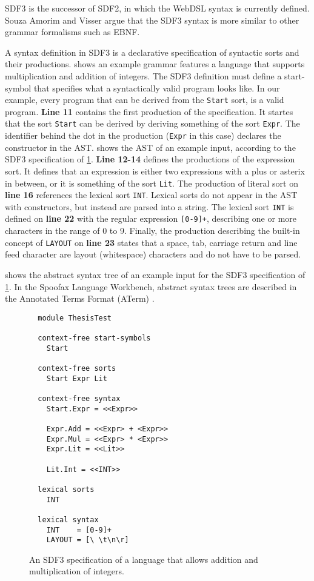       SDF3 is the successor of SDF2, in which the WebDSL syntax is currently defined. Souza Amorim and Visser \citeyear{AmorimV20} argue that the SDF3 syntax is more similar to other grammar formalisms such as EBNF.

      A syntax definition in SDF3 is a declarative specification of syntactic sorts and their productions.  shows an example grammar features a language that supports multiplication and addition of integers. The SDF3 definition must define a start-symbol that specifies what a syntactically valid program looks like. In our example, every program that can be derived from the \texttt{Start} sort, is a valid program. \textbf{Line 11} contains the first production of the specification. It startes that the sort \texttt{Start} can be derived by deriving something of the sort \texttt{Expr}. The identifier behind the dot in the production (\texttt{Expr} in this case) declares the constructor in the AST.  shows the AST of an example input, according to the SDF3 specification of \cref{fig:sdf3-sorts-and-productions-syntax}. \textbf{Line 12-14} defines the productions of the expression sort. It defines that an expression is either two expressions with a plus or asterix in between, or it is something of the sort \texttt{Lit}. The production of literal sort on \textbf{line 16} references the lexical sort \texttt{INT}. Lexical sorts do not appear in the AST with constructors, but instead are parsed into a string. The lexical sort \texttt{INT} is defined on \textbf{line 22} with the regular expression \texttt{[0-9]+}, describing one or more characters in the range of 0 to 9. Finally, the production describing the built-in concept of \texttt{LAYOUT} on \textbf{line 23} states that a space, tab, carriage return and line feed character are layout (whitespace) characters and do not have to be parsed.

       shows the abstract syntax tree of an example input for the SDF3 specification of \cref{fig:sdf3-sorts-and-productions-syntax}. In the Spoofax Language Workbench, abstract syntax trees are described in the Annotated Terms Format (ATerm) \autocite{BrandJKO00}.

      \begin{figure}
        \begin{verbatim}
  module ThesisTest

  context-free start-symbols
    Start

  context-free sorts
    Start Expr Lit

  context-free syntax
    Start.Expr = <<Expr>>

    Expr.Add = <<Expr> + <Expr>>
    Expr.Mul = <<Expr> * <Expr>>
    Expr.Lit = <<Lit>>

    Lit.Int = <<INT>>

  lexical sorts
    INT

  lexical syntax
    INT    = [0-9]+
    LAYOUT = [\ \t\n\r]
        \end{verbatim}
        \caption{\label{fig:sdf3-sorts-and-productions-syntax}An SDF3 specification of a language that allows addition and multiplication of integers.}
      \end{figure}

